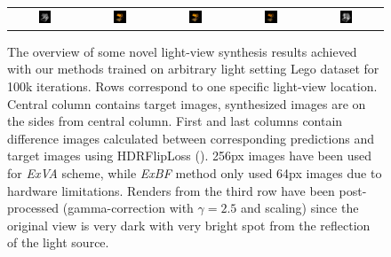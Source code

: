 \begin{figure}[!htb]
\begin{tabular*}{\textwidth}{ c c c c c }
          \includegraphics[width=0.19\textwidth]{figures/results/arb_set/validation/lego14_exva_hdrflip_150k.png}
        & \includegraphics[width=0.19\textwidth]{figures/results/arb_set/validation/lego14_exva_150k.png}
        & \includegraphics[width=0.19\textwidth]{figures/results/arb_set/validation/lego14_targ_256px.png}
        & \includegraphics[width=0.19\textwidth]{figures/results/arb_set/validation/lego14_exbf_112k.png}
        & \includegraphics[width=0.19\textwidth]{figures/results/arb_set/validation/lego14_exbf_hdrflip_112k.png}
        

    \end{tabular*}
    \caption{The overview of some novel light-view synthesis results
    achieved with our methods trained on arbitrary light setting Lego dataset for 100k iterations.
    Rows correspond to one specific light-view location.
    Central column contains target images,
    synthesized images are on the sides from central column.
    First and last columns contain difference images
    calculated between corresponding predictions and target images using HDRFlipLoss ().
    256px images have been used for \textit{ExVA} scheme,
    while \textit{ExBF} method only used 64px images due to hardware limitations.
    Renders from the third row have been post-processed (gamma-correction with $\gamma = 2.5$ and scaling)
    since the original view is very dark with very bright spot from the reflection of the light source.
    }
    \label{tab:arb_selective_results}
\end{figure}
\endgroup